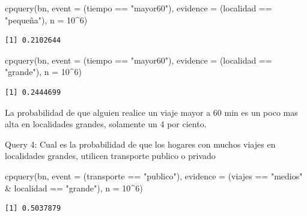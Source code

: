 \documentclass[
  11pt,
  a4paper,
]{article}
\newenvironment{Shaded}{\begin{snugshade}}{\end{snugshade}}
\newcommand{\AttributeTok}[1]{\textcolor[rgb]{0.40,0.45,0.13}{#1}}
\newcommand{\DecValTok}[1]{\textcolor[rgb]{0.68,0.00,0.00}{#1}}
\newcommand{\FunctionTok}[1]{\textcolor[rgb]{0.28,0.35,0.67}{#1}}
\newcommand{\NormalTok}[1]{\textcolor[rgb]{0.00,0.23,0.31}{#1}}
\newcommand{\SpecialCharTok}[1]{\textcolor[rgb]{0.37,0.37,0.37}{#1}}
\newcommand{\StringTok}[1]{\textcolor[rgb]{0.13,0.47,0.30}{#1}}
\begin{document}
\begin{Shaded}
\begin{Highlighting}[numbers=left,,]
\FunctionTok{cpquery}\NormalTok{(bn, }\AttributeTok{event =}\NormalTok{ (tiempo }\SpecialCharTok{==} \StringTok{"mayor60"}\NormalTok{), }\AttributeTok{evidence =}\NormalTok{ (localidad }\SpecialCharTok{==} \StringTok{"pequeña"}\NormalTok{), }\AttributeTok{n =} \DecValTok{10}\SpecialCharTok{\^{}}\DecValTok{6}\NormalTok{)}
\end{Highlighting}
\end{Shaded}

\begin{verbatim}
[1] 0.2102644
\end{verbatim}

\begin{Shaded}
\begin{Highlighting}[numbers=left,,]
\FunctionTok{cpquery}\NormalTok{(bn, }\AttributeTok{event =}\NormalTok{ (tiempo }\SpecialCharTok{==} \StringTok{"mayor60"}\NormalTok{), }\AttributeTok{evidence =}\NormalTok{ (localidad }\SpecialCharTok{==} \StringTok{"grande"}\NormalTok{), }\AttributeTok{n =} \DecValTok{10}\SpecialCharTok{\^{}}\DecValTok{6}\NormalTok{)}
\end{Highlighting}
\end{Shaded}

\begin{verbatim}
[1] 0.2444699
\end{verbatim}

La probabilidad de que alguien realice un viaje mayor a 60 min es un
poco mas alta en localidades grandes, solamente un 4 por ciento.

Query 4: Cual es la probabilidad de que los hogares con muchos viajes en
localidades grandes, utilicen transporte publico o privado

\begin{Shaded}
\begin{Highlighting}[numbers=left,,]
\FunctionTok{cpquery}\NormalTok{(bn, }\AttributeTok{event =}\NormalTok{ (transporte }\SpecialCharTok{==} \StringTok{"publico"}\NormalTok{), }\AttributeTok{evidence =}\NormalTok{ (viajes }\SpecialCharTok{==} \StringTok{"medios"} \SpecialCharTok{\&}\NormalTok{ localidad }\SpecialCharTok{==} \StringTok{"grande"}\NormalTok{), }\AttributeTok{n =} \DecValTok{10}\SpecialCharTok{\^{}}\DecValTok{6}\NormalTok{)}
\end{Highlighting}
\end{Shaded}

\begin{verbatim}
[1] 0.5037879
\end{verbatim}
\end{document}
